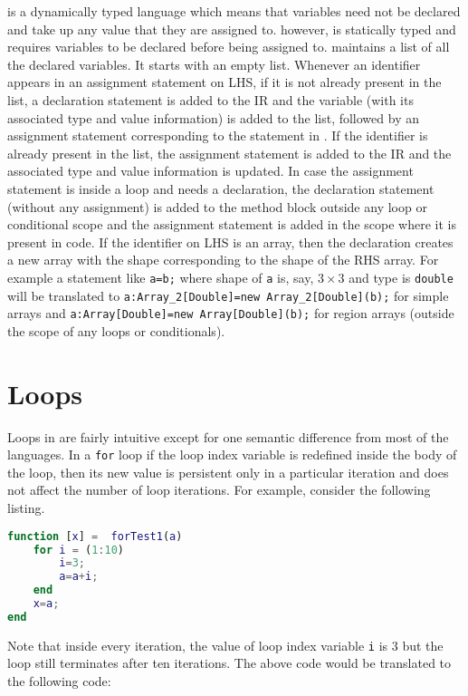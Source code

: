 \matlab is a dynamically typed language which means that variables need
not be declared and take up any value that they are assigned to. \xten
however, is statically typed and requires variables to be declared before
being assigned to. \mixten maintains a list of all the declared
variables. It starts with an empty list. Whenever an identifier appears
in an assignment statement on LHS, if it is not already present in the
list, a declaration statement is added to the \xten IR and the variable
(with its associated type and value information) is added to the list, followed
by an assignment statement corresponding to the statement in \matlab.
If the identifier is already present in the list, the assignment statement is
added to the \xten IR and the associated type and value information is
updated. In case the \matlab assignment statement is inside a loop and
needs a declaration, the declaration statement (without any assignment)
is added to the method block outside any loop or conditional scope and
the assignment statement is added in the scope where it is present in
\matlab code. If the identifier on LHS is an array, then the declaration
creates a new array with the shape corresponding to the shape of the
RHS array. For example a \matlab statement like \verb|a=b;| where shape of
\verb|a| is, say, $3\times3$ and type is \verb|double| will be
translated to \verb|a:Array_2[Double]=new Array_2[Double](b);| for simple arrays
and \verb|a:Array[Double]=new Array[Double](b);| for region arrays
(outside the scope of any loops or conditionals). 
 
\section{Loops}

Loops in \matlab are fairly intuitive except for one semantic difference
from most of the languages. In a \verb|for| loop if the loop index
variable is redefined inside the body of the loop, then its new value is
persistent only in a particular iteration and does not affect the number
of loop iterations. For example, consider the following listing.

\begin{lstlisting}[language=Matlab,numbers=none]
function [x] =  forTest1(a)
    for i = (1:10)
        i=3;
        a=a+i;
    end
    x=a;
end
\end{lstlisting}

\noindent 
Note that inside every iteration, the value of loop index
variable \verb|i| is 3 but the loop still terminates after ten
iterations. The above code would be translated to the following \xten
code:

